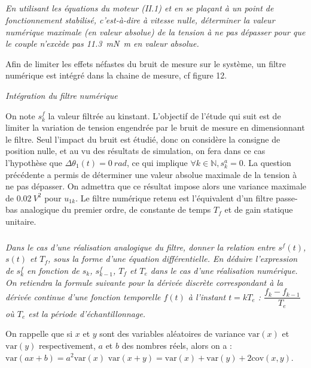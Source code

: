 \subparagraph{}
\textit{En utilisant les équations du moteur (II.1) et en se plaçant à un point de fonctionnement stabilisé,
c’est-à-dire à vitesse nulle, déterminer la valeur numérique maximale (en valeur absolue) de la tension à ne pas
dépasser pour que le couple n’excède pas \SI{11,3}{mN.m} en valeur absolue.}
\ifprof
\begin{corrige}
\end{corrige}
\else
\fi

Afin de limiter les effets néfastes du bruit de mesure sur le système, un filtre numérique est intégré dans la
chaine de mesure, cf figure 12.


\begin{center}


\textit{Intégration du filtre numérique}
\end{center}

On note $s_k^f$ la valeur filtrée au k\ieme instant. L’objectif de l’étude qui suit est de limiter la variation de
tension engendrée par le bruit de mesure en dimensionnant le filtre. Seul l’impact du bruit est étudié, donc on
considère la consigne de position nulle, et au vu des résultats de simulation, on fera dans ce cas l’hypothèse que
$\Delta\theta_1(t)=\SI{0}{rad}$, ce qui implique $\forall k \in \mathbb{N}, s_k^a =0$.
La question précédente a permis de déterminer une valeur absolue maximale de la tension à ne pas dépasser. On admettra
que ce résultat impose alors une variance maximale de $\SI{0,02}{V^2}$ pour $u_{1k}$.
Le filtre numérique retenu est l’équivalent d’un filtre passe-bas analogique du premier ordre, de constante de
temps $T_f$ et de gain statique unitaire.

\subparagraph{}
\textit{Dans le cas d’une réalisation analogique du filtre, donner la relation entre $s^f(t)$, $s(t)$ et $T_f$, sous la
forme d’une équation différentielle. En déduire l’expression de $s_k^f$ en fonction de 
$s_k$, $s_{k-1}^f$, $T_f$ et $T_e$ dans le cas d'une réalisation numérique. On retiendra la formule suivante pour la dérivée discrète correspondant à la dérivée continue d’une fonction temporelle $f(t)$ à l’instant $t=kT_e$ : 
$\dfrac{f_k  -f_{k-1}}{T_e}$ où $T_e$ est la période d’échantillonnage.}

\ifprof
\begin{corrige}
\end{corrige}
\else
\fi

On rappelle que si $x$ et $y$ sont des variables aléatoires de variance $\text{var}(x)$ et $\text{var}(y)$ respectivement, $a$ et $b$ des nombres réels, alors on a : $\text{var}\left(ax+b\right) = a^2 \text{var}(x)$ $\text{var}\left(x+y\right) = \text{var}(x)+\text{var}(y)+2\text{cov}(x,y)$. 

